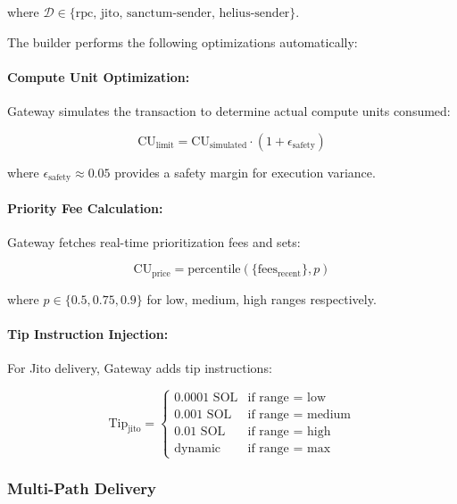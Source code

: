 \documentclass[11pt,a4paper]{article}
\begin{document}
where $\mathcal{D} \in \{\text{rpc, jito, sanctum-sender, helius-sender}\}$.

The builder performs the following optimizations automatically:

\paragraph{Compute Unit Optimization:} Gateway simulates the transaction to determine actual compute units consumed:

\begin{equation}
\text{CU}_{\text{limit}} = \text{CU}_{\text{simulated}} \cdot (1 + \epsilon_{\text{safety}})
\end{equation}

where $\epsilon_{\text{safety}} \approx 0.05$ provides a safety margin for execution variance.

\paragraph{Priority Fee Calculation:} Gateway fetches real-time prioritization fees and sets:

\begin{equation}
\text{CU}_{\text{price}} = \text{percentile}(\{\text{fees}_{\text{recent}}\}, p)
\end{equation}

where $p \in \{0.5, 0.75, 0.9\}$ for low, medium, high ranges respectively.

\paragraph{Tip Instruction Injection:} For Jito delivery, Gateway adds tip instructions:

\begin{equation}
\text{Tip}_{\text{jito}} = \begin{cases}
0.0001 \text{ SOL} & \text{if range = low} \\
0.001 \text{ SOL} & \text{if range = medium} \\
0.01 \text{ SOL} & \text{if range = high} \\
\text{dynamic} & \text{if range = max}
\end{cases}
\end{equation}

\subsubsection{Multi-Path Delivery}
\end{document}
